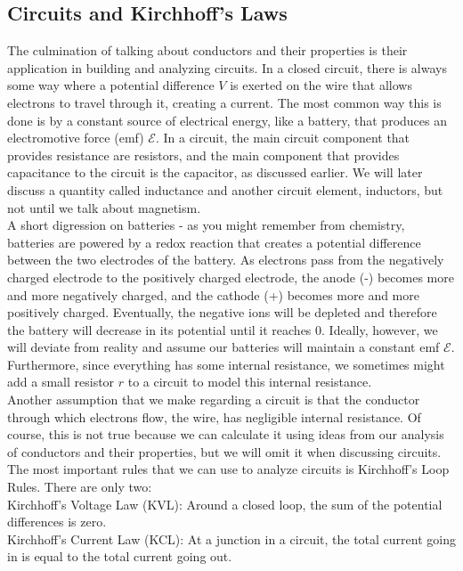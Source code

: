 \subsection{Circuits and Kirchhoff's Laws}
The culmination of talking about conductors and their properties is their application in building and analyzing circuits. In a closed circuit, there is always some way where a potential difference $V$ is exerted on the wire that allows electrons to travel through it, creating a current. The most common way this is done is by a constant source of electrical energy, like a battery, that produces an electromotive force (emf) $\mathscr{E}$. In a circuit, the main circuit component that provides resistance are resistors, and the main component that provides capacitance to the circuit is the capacitor, as discussed earlier. We will later discuss a quantity called inductance and another circuit element, inductors, but not until we talk about magnetism. \\
A short digression on batteries - as you might remember from chemistry, batteries are powered by a redox reaction that creates a potential difference between the two electrodes of the battery. As electrons pass from the negatively charged electrode to the positively charged electrode, the anode (-) becomes more and more negatively charged, and the cathode (+) becomes more and more positively charged. Eventually, the negative ions will be depleted and therefore the battery will decrease in its potential until it reaches 0. Ideally, however, we will deviate from reality and assume our batteries will maintain a constant emf $\mathscr{E}$. Furthermore, since everything has some internal resistance, we sometimes might add a small resistor $r$ to a circuit to model this internal resistance. \\
Another assumption that we make regarding a circuit is that the conductor through which electrons flow, the wire, has negligible internal resistance. Of course, this is not true because we can calculate it using ideas from our analysis of conductors and their properties, but we will omit it when discussing circuits. \\
The most important rules that we can use to analyze circuits is Kirchhoff's Loop Rules. There are only two:\\
Kirchhoff's Voltage Law (KVL):  Around a closed loop, the sum of the potential differences is zero. \\
Kirchhoff's Current Law (KCL): At a junction in a circuit, the total current going in is equal to the total current going out. \\
